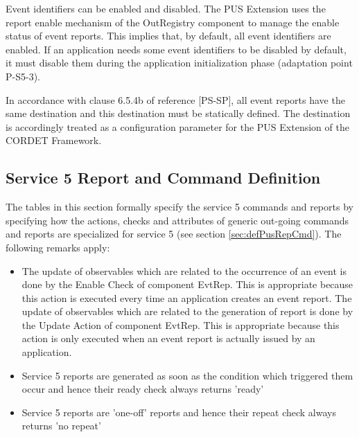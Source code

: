 \documentclass{pnp_article}
\begin{document}
Event identifiers can be enabled and disabled. The PUS Extension uses the report enable mechanism of the OutRegistry component to manage the enable status of event reports. This implies that, by default, all event identifiers are enabled. If an application needs some event identifiers to be disabled by default, it must disable them during the application initialization phase (adaptation point P-S5-3).

In accordance with clause 6.5.4b of reference [PS-SP], all event reports have the same destination and this destination must be statically defined. The destination is accordingly treated as a configuration parameter for the PUS Extension of the CORDET Framework.

\subsection{Service 5 Report and Command Definition}\label{sec:serv5RepCmdDef}
The tables in this section formally specify the service 5 commands and reports by specifying how the actions, checks and attributes of generic out-going commands and reports are specialized for service 5 (see section \ref{sec:defPusRepCmd}). The following remarks apply:

\begin{itemize}
\item The update of observables which are related to the occurrence of an event is done by the Enable Check of component EvtRep. This is appropriate because this action is executed every time an application creates an event report. The update of observables which are related to the generation of report is done by the Update Action of component EvtRep. This is appropriate because this action is only executed when an event report is actually issued by an application.
\item Service 5 reports are generated as soon as the condition which triggered them occur and hence their ready check always returns 'ready'
\item Service 5 reports are 'one-off' reports and hence their repeat check always returns 'no repeat'
\end{itemize}

\newpage
{}
\newpage
{}
\newpage
{}
\newpage
{}
\end{document}
